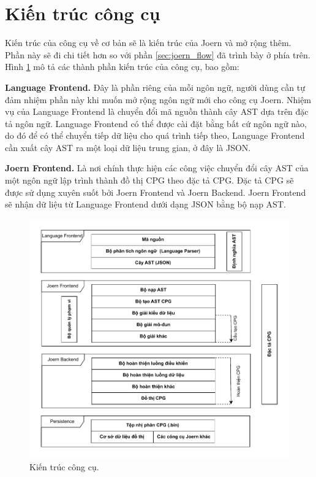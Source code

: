 \section{Kiến trúc công cụ}
\label{chapter:arch}

Kiến trúc của công cụ về cơ bản sẽ là kiến trúc của Joern và mở rộng thêm.
Phần này sẽ đi chi tiết hơn so với phần \ref{sec:joern_flow} đã trình bày ở phía trên.
Hình \ref{img:c3_arch} mô tả các thành phần kiến trúc của công cụ, bao gồm:

\textbf{Language Frontend.} Đây là phần riêng của mỗi ngôn ngữ, người dùng cần tự đảm nhiệm phần này khi muốn mở rộng ngôn ngữ mới cho công cụ Joern.
Nhiệm vụ của Language Frontend là chuyển đổi mã nguồn thành cây AST dựa trên đặc tả ngôn ngữ.
Language Frontend có thể được cài đặt bằng bất cứ ngôn ngữ nào, do đó để có thể chuyển tiếp dữ liệu cho quá trình tiếp theo, Language Frontend cần xuất cây AST ra một loại dữ liệu trung gian, ở đây là JSON.

\textbf{Joern Frontend.} Là nơi chính thực hiện các công việc chuyển đổi cây AST của một ngôn ngữ lập trình thành đồ thị CPG theo đặc tả CPG.
Đặc tả CPG sẽ được sử dụng xuyên suốt bởi Joern Frontend và Joern Backend.
Joern Frontend sẽ nhận dữ liệu từ Language Frontend dưới dạng JSON bằng bộ nạp AST.

\begin{figure}[H]
	\includegraphics[width=1\columnwidth]{figures/c3/c3_arch.drawio.pdf}
	\centering
	\caption{Kiến trúc công cụ.}
	\label{img:c3_arch}
\end{figure}

